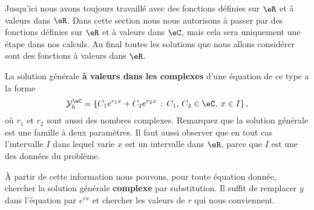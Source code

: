 \begin{framed}
	Jusqu'ici nous avons toujours travaillé avec des fonctions définies sur \( \eR\) et à valeurs dans \( \eR\). Dans cette section nous nous autorisons à passer par des fonctions définies sur \( \eR\) et à valeurs dans \( \eC\), mais cela sera uniquement une étape dans nos calculs. Au final toutes les solutions que nous allons considérer sont des fonctions à valeurs dans \( \eR\).
\end{framed}

La solution générale \textbf{à valeurs dans les complexes} d'une équation de ce type a la forme
\begin{equation}\label{sol_gen_ordre_deux_hom}
	\mathcal{Y}_h^\eC  = \left\{C_1 e^{r_1x} +C_2 e^{r_2x} \,:\, C_1,\, C_2 \in \eC, \: x\in I \right\},
\end{equation}
où \( r_1\) et \( r_2\) sont aussi des nombres complexes. Remarquez que la solution générale est une famille à deux paramètres. Il faut aussi observer que en tout cas l'intervalle \( I\) dans lequel varie \( x\) est un intervalle dans \( \eR\), parce que \( I\) est une des données du problème.

À partir de cette information nous pouvons, pour toute équation donnée, chercher la solution générale \textbf{complexe} par substitution. Il suffit de remplacer \( y\) dans l'équation par \( e^{rx}\) et chercher les valeurs de \( r\) qui nous conviennent.


